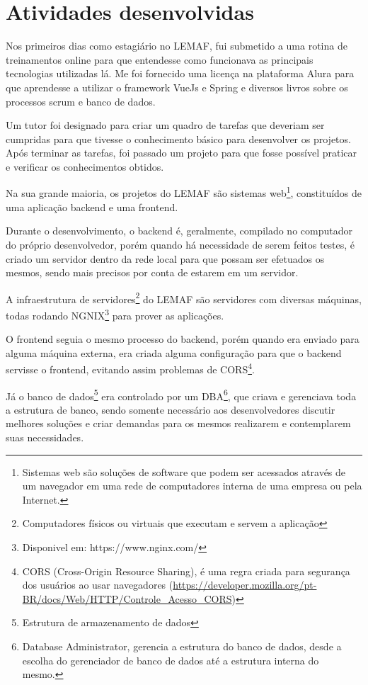 \chapter{Atividades desenvolvidas}
\label{cap:desenvolvimento}

Nos primeiros dias como estagiário no LEMAF, fui submetido a uma rotina de treinamentos online para que entendesse como funcionava as principais tecnologias utilizadas lá.
Me foi fornecido uma licença na plataforma Alura para que aprendesse a utilizar o framework VueJs e Spring e diversos livros sobre os processos scrum e banco de dados.

Um tutor foi designado para criar um quadro de tarefas que deveriam ser cumpridas para que tivesse o conhecimento básico para desenvolver os projetos.
Após terminar as tarefas, foi passado um projeto para que fosse possível praticar e verificar os conhecimentos obtidos.

Na sua grande maioria, os projetos do LEMAF são sistemas web\footnote{Sistemas web são soluções de software que podem ser acessados através de um navegador  em uma rede de computadores interna de uma empresa ou pela Internet.
}, constituídos de uma aplicação backend e uma frontend.

Durante o desenvolvimento, o backend é, geralmente, compilado no computador do próprio desenvolvedor, porém quando há necessidade de serem feitos testes, é criado um servidor dentro da rede local para que possam ser efetuados os mesmos, sendo mais precisos por conta de estarem em um servidor.

A infraestrutura de servidores\footnote{Computadores físicos ou virtuais que executam e servem a aplicação} do LEMAF são servidores com diversas máquinas, todas rodando NGNIX\footnote{Disponivel em: https://www.nginx.com/} para prover as aplicações.

O frontend seguia o mesmo processo do backend, porém quando era enviado para alguma máquina externa, era criada alguma configuração para que o backend servisse o frontend, evitando assim problemas de CORS\footnote{CORS  (Cross-Origin Resource Sharing), é uma regra criada para segurança dos usuários ao  usar navegadores (\url{https://developer.mozilla.org/pt-BR/docs/Web/HTTP/Controle_Acesso_CORS})}.

Já o banco de dados\footnote{Estrutura de armazenamento de dados} era controlado por um DBA\footnote{Database Administrator, gerencia a estrutura do banco de dados, desde a escolha do gerenciador de banco de dados até a estrutura interna do mesmo.}, que criava e gerenciava toda a estrutura de banco, sendo somente necessário aos desenvolvedores discutir melhores soluções e criar demandas para os mesmos realizarem e contemplarem suas necessidades.

